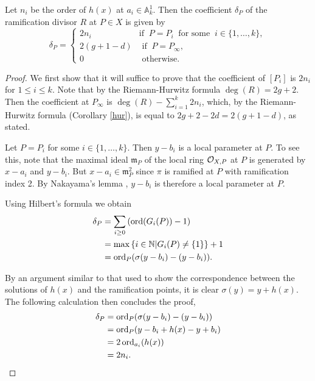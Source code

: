     \begin{lem}\label{char2ramification}
    Let $n_i$ be the order of $h(x)$ at $a_i\in \mathbb A_k^1$.
    Then the coefficient $\delta_P$ of the ramification divisor $R$ at $P\in X$ is given by
        \[
        \delta_P = \left\{
            \begin{array}{ll}
            2n_i & \text{if }\ P=P_i\ \text{ for some }\ i \in \{1,\ldots ,k\}, \\
            2(g+1-d) & \text{ if }\  P=P_\infty, \\
            0 & \text{ otherwise.} 
            \end{array}
        \right.
        \]
    \end{lem}
    \begin{proof}
    We first show that it will suffice to prove that the coefficient of $[P_i]$ is $2n_i$ for $1\leq i \leq k$.
    Note that by the Riemann-Hurwitz formula $\deg(R) = 2g+2$.
    Then the coefficient at $P_\infty$ is $\deg(R) - \sum_{i=1}^k2n_i$, which, by the Riemann-Hurwitz formula (Corollary \ref{hur}), is equal to $2g+2-2d = 2(g+1-d)$, as stated.
    
    Let $P=P_i$ for some $i\in \{1,\ldots , k\}$.
    Then $y-b_i$ is a local parameter at $P$.
    To see this, note that the maximal ideal $\mathfrak m_{P}$ of the local ring ${\cal O}_{X,P}$ at $P$ is generated by $x-a_i$ and $y-b_i$.
    But $x-a_i\in \mathfrak m_{P}^2$ since $\pi$ is ramified at $P$ with ramification index 2.
    By Nakayama's lemma \cite[Prop. 2.6]{atiyahmacdonald}, $y-b_i$ is therefore a local parameter at $P$.
    
    Using Hilbert's formula \cite[Chap. IV, \S 1, Prop. 4]{localfields} we obtain
        \begin{align*}
        \delta_P & =  \sum_{i\geq 0} \left(\operatorname{ord}(G_i(P))-1\right) \\
        & =  \max\left\{ i\in {\mathbb N} | G_i(P)\neq \{1\}\right\} + 1 \\
        & =  \operatorname{ord}_{P}(\sigma(y-b_i) - (y-b_i)).
        \end{align*}
    
    By an argument similar to that used to show the correspondence between the solutions of $h(x)$ and the ramification points, it is clear $\sigma(y)=y+h(x)$.
    The following calculation then concludes the proof,
        \begin{align*}
        \delta_P & =  \operatorname{ord}_{P}(\sigma(y-b_i) - (y-b_i)) \\
        & =  \operatorname{ord}_{P}(y-b_i+h(x) - y + b_i) \\
        & =  2\operatorname{ord}_{a_i}(h(x)) \\
        & =  2n_i.
        \end{align*}
    \end{proof}



